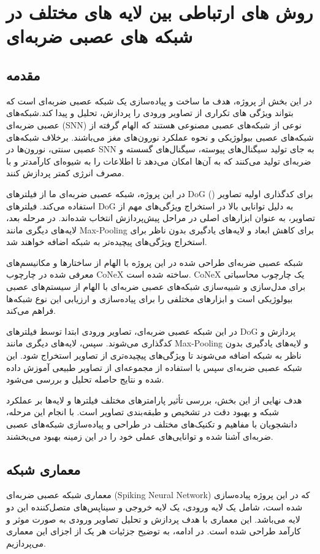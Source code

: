 \chapter{روش های ارتباطی بین لایه های مختلف در شبکه های عصبی ضربه‌ای}
    \section{مقدمه}
    در این بخش از پروژه، هدف ما ساخت و پیاده‌سازی یک شبکه عصبی ضربه‌ای است که بتواند ویژگی های تکراری از تصاویر ورودی را پردازش، تحلیل و پیدا کند.شبکه‌های عصبی ضربه‌ای 
    (SNN) 
    نوعی از شبکه‌های عصبی مصنوعی هستند که الهام گرفته از شبکه‌های عصبی بیولوژیکی و نحوه عملکرد نورون‌های مغز می‌باشند. برخلاف شبکه‌های عصبی سنتی، نورون‌ها در 
    SNN 
    به جای تولید سیگنال‌های پیوسته، سیگنال‌های گسسته و ضربه‌ای تولید می‌کنند که به آن‌ها امکان می‌دهد تا اطلاعات را به شیوه‌ای کارآمدتر و با مصرف انرژی کمتر پردازش کنند.

    در این پروژه، شبکه عصبی ضربه‌ای ما از فیلترهای 
    DoG () 
    برای کدگذاری اولیه تصاویر استفاده می‌کند. فیلترهای 
    DoG 
    به دلیل توانایی بالا در استخراج ویژگی‌های مهم از تصاویر، به عنوان ابزارهای اصلی در مراحل پیش‌پردازش انتخاب شده‌اند. در مرحله بعد، لایه‌های دیگری مانند 
    Max-Pooling 
    برای کاهش ابعاد و لایه‌های یادگیری بدون ناظر برای استخراج ویژگی‌های پیچیده‌تر به شبکه اضافه خواهند شد.

    شبکه عصبی ضربه‌ای طراحی شده در این پروژه با الهام از ساختارها و مکانیسم‌های معرفی شده در چارچوب 
    CoNeX 
    ساخته شده است. 
    CoNeX 
    یک چارچوب محاسباتی برای مدل‌سازی و شبیه‌سازی شبکه‌های عصبی ضربه‌ای با الهام از سیستم‌های عصبی بیولوژیکی است و ابزارهای مختلفی را برای پیاده‌سازی و ارزیابی این نوع شبکه‌ها فراهم می‌کند.
    
    در این شبکه عصبی ضربه‌ای، تصاویر ورودی ابتدا توسط فیلترهای DoG پردازش و کدگذاری می‌شوند. سپس، لایه‌های دیگری مانند 
    Max-Pooling 
    و لایه‌های یادگیری بدون ناظر به شبکه اضافه می‌شوند تا ویژگی‌های پیچیده‌تری از تصاویر استخراج شود. این شبکه عصبی ضربه‌ای سپس با استفاده از مجموعه‌ای از تصاویر طبیعی آموزش داده شده و نتایج حاصله تحلیل و بررسی می‌شود.
    
    هدف نهایی از این بخش، بررسی تأثیر پارامترهای مختلف فیلترها و لایه‌ها بر عملکرد شبکه و بهبود دقت در تشخیص و طبقه‌بندی تصاویر است. با انجام این مرحله، دانشجویان با مفاهیم و تکنیک‌های مختلف در طراحی و پیاده‌سازی شبکه‌های عصبی ضربه‌ای آشنا شده و توانایی‌های عملی خود را در این زمینه بهبود می‌بخشند.

    \section{معماری شبکه}
    معماری شبکه عصبی ضربه‌ای (Spiking Neural Network) که در این پروژه پیاده‌سازی شده است، شامل یک لایه ورودی، یک لایه خروجی و سیناپس‌های متصل‌کننده این دو لایه می‌باشد. این معماری با هدف پردازش و تحلیل تصاویر ورودی به صورت موثر و کارآمد طراحی شده است. در ادامه، به توضیح جزئیات هر یک از اجزای این معماری می‌پردازیم.

